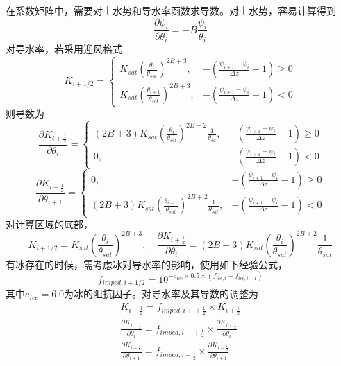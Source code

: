 在系数矩阵中，需要对土水势和导水率函数求导数。对土水势，容易计算得到
\begin{equation}
\frac{\partial \psi_{i}}{\partial \theta_{i}}=-B \frac{\psi_{i}}{\theta_{i}}
\end{equation}
对导水率，若采用迎风格式
\begin{equation}
    K_{i+1/2}=\left\{\begin{array}{rl} K_{ {sat }}\left(\frac{\theta_{i}}{\theta_{ {sat }}}\right)^{2 B+3},
       & -\left(\frac{\psi_{i+1}-\psi_{i}}{\Delta z}-1\right) \geq 0 \\ K_{ {sat }}\left(\frac{\theta_{i+1}}{\theta_{ {sat }}}\right)^{2 B+3},
       & -\left(\frac{\psi_{i+1}-\psi_{i}}{\Delta z}-1\right)<0\end{array}\right.
\end{equation}
则导数为
\begin{equation}
\frac{\partial K_{i+\frac{1}{2}}}{\partial \theta_{i}}=\begin{cases}
  (2 B+3) K_{ {sat }}\left(\frac{\theta_{i}}{\theta_{sat}}\right)^{2 B+2} 
    \frac{1}{\theta_{s a}}, & -\left(\frac{\psi_{i+1}-\psi_{i}}{\Delta z}-1\right) \geq 0 \\ 
   0, & -\left(\frac{\psi_{i+1}-\psi_{i}}{\Delta z}-1\right) < 0 
  \end{cases}
\end{equation}
\begin{equation}
\frac{\partial K_{i+\frac{1}{2}}}{\partial \theta_{i+1}}=\begin{cases}
     0, & -\left(\frac{\psi_{i+1}-\psi_{i}}{\Delta z}-1\right) \geq 0 \\
     (2 B+3) K_{ {sat }}\left(\frac{\theta_{i+1}}{\theta_{ {sat }}}\right)^{2 B+2} \frac{1}{\theta_{ {sat }}}, & -\left(\frac{\psi_{i+1}-\psi_{i}}{\Delta z}-1\right) <0 
   \end{cases}
\end{equation}
对计算区域的底部，
\begin{equation}
K_{i+1 / 2}=K_{ {sat }}\left(\frac{\theta_{i}}{\theta_{ {sat }}}\right)^{2 B+3}, \quad \frac{\partial K_{i+\frac{1}{2}}}
{\partial \theta_{i}}=(2 B+3) K_{ {sat }}\left(\frac{\theta_{i}}{\theta_{ {sat }}}\right)^{2 B+2} \frac{1}{\theta_{sat}}
\end{equation}
有冰存在的时候，需考虑冰对导水率的影响，使用如下经验公式，
\begin{equation}
    {f}_{{imped}, {i}+1 / 2}=10^{-e_{ice}\times 0.5\times\left(f_{i c e, i}+f_{i c e, i+1}\right)}
\end{equation}
其中$e_{ice}=6.0$为冰的阻抗因子。对导水率及其导数的调整为
\begin{equation}
\begin{array}{c}K_{i+\frac{1}{2}}={f}_{ {imped,i+ }+\frac{1}{2}} \times K_{i+\frac{1}{2}} \\ \frac{\partial K_{i+\frac{1}{2}}}{\partial \theta_{i}}
    ={f}_{ {imped,i+ }+\frac{1}{2}} \times \frac{\partial K_{i+\frac{1}{2}}}{\partial \theta_{i}} \\ \frac{\partial K_{i+\frac{1}{2}}}{\partial \theta_{i+1}}=
    {f}_{ {imped,i+ } \frac{1}{2}} \times \frac{\partial K_{i+\frac{1}{2}}}{\partial \theta_{i+1}}\end{array}
\end{equation}


